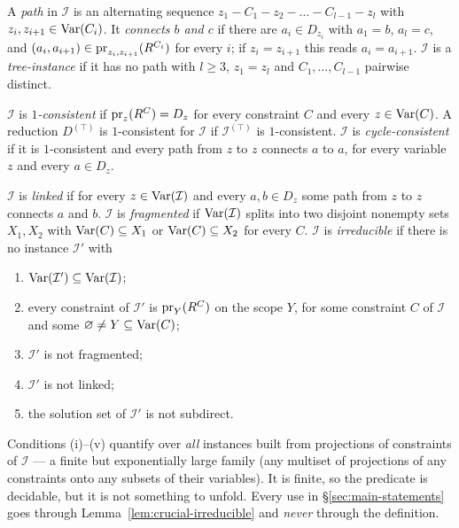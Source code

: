 \begin{definition}[Paths]\label{def:path}
A \emph{path} in $\mathcal I$ is an alternating sequence
$z_{1}-C_{1}-z_{2}-\dots-C_{l-1}-z_{l}$ with $z_{i},z_{i+1}\in\operatorname{Var}(C_{i})$.
It \emph{connects $b$ and $c$} if there are $a_{i}\in D_{z_{i}}$ with
$a_{1}=b$, $a_{l}=c$, and $(a_{i},a_{i+1})\in\operatorname*{pr}_{z_{i},z_{i+1}}(R^{C_{i}})$
for every $i$; if $z_{i}=z_{i+1}$ this reads $a_{i}=a_{i+1}$.
$\mathcal I$ is a \emph{tree-instance} if it has no path with $l\ge 3$,
$z_{1}=z_{l}$ and $C_{1},\dots,C_{l-1}$ pairwise distinct.
\end{definition}

\begin{definition}[Consistency]\label{def:consistency}
$\mathcal I$ is \emph{$1$-consistent} if $\operatorname*{pr}_{z}(R^{C})=D_{z}$ for every
constraint $C$ and every $z\in\operatorname{Var}(C)$. A reduction $D^{(\top)}$ is
$1$-consistent for $\mathcal I$ if $\mathcal I^{(\top)}$ is $1$-consistent.
$\mathcal I$ is \emph{cycle-consistent} if it is $1$-consistent and every path
from $z$ to $z$ connects $a$ to $a$, for every variable $z$ and every
$a\in D_{z}$.
\end{definition}

\begin{definition}\label{def:instance-linked}
$\mathcal I$ is \emph{linked} if for every $z\in\operatorname{Var}(\mathcal I)$ and every
$a,b\in D_{z}$ some path from $z$ to $z$ connects $a$ and $b$.
$\mathcal I$ is \emph{fragmented} if $\operatorname{Var}(\mathcal I)$ splits into two disjoint
nonempty sets $X_{1},X_{2}$ with $\operatorname{Var}(C)\subseteq X_{1}$ or
$\operatorname{Var}(C)\subseteq X_{2}$ for every $C$.
$\mathcal I$ is \emph{irreducible} if there is no instance $\mathcal I'$ with
\begin{enumerate}\romanlabels\tightlist
\item $\operatorname{Var}(\mathcal I')\subseteq\operatorname{Var}(\mathcal I)$;
\item every constraint of $\mathcal I'$ is $\operatorname*{pr}_{Y}(R^{C})$ on the scope $Y$,
  for some constraint $C$ of $\mathcal I$ and some $\varnothing\neq Y\subseteq
  \operatorname{Var}(C)$;
\item $\mathcal I'$ is not fragmented;
\item $\mathcal I'$ is not linked;
\item the solution set of $\mathcal I'$ is not subdirect.
\end{enumerate}
\end{definition}

\begin{hazard}
\label{haz:irreducible-instance}
Conditions (i)--(v) quantify over \emph{all} instances built from projections
of constraints of $\mathcal I$ --- a finite but exponentially large family
(any multiset of projections of any constraints onto any subsets of their
variables). It is finite, so the predicate is decidable, but it is not
something to unfold. Every use in \S\ref{sec:main-statements} goes through
Lemma~\ref{lem:crucial-irreducible} and \emph{never} through the definition.
\end{hazard}

